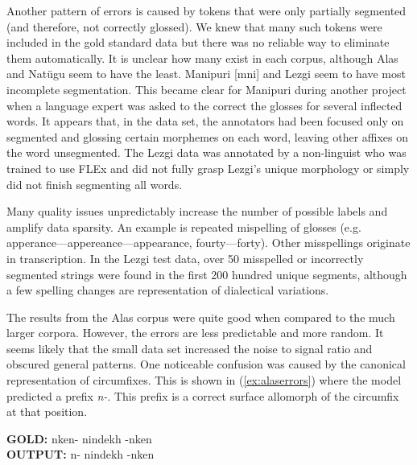 Another pattern of errors is caused by tokens that were only partially segmented (and therefore, not correctly glossed). We knew that many such tokens were included in the gold standard data but there was no reliable way to eliminate them automatically. It is unclear how many exist in each corpus, although Alas and Nat\"ugu seem to have the least. Manipuri [mni] and Lezgi seem to have most incomplete segmentation. This became clear for Manipuri during another project when a language expert was asked to the correct the glosses for several inflected words. It appears that, in the data set, the annotators had been focused only on segmented and glossing certain morphemes on each word, leaving other affixes on the word unsegmented. 
The Lezgi data was annotated by a non-linguist who was trained to use FLEx and did not fully grasp Lezgi's unique morphology or simply did not finish segmenting all words. 

Many quality issues unpredictably increase the number of possible labels and amplify data sparsity. An example is
repeated mispelling of glosses (e.g. apperance---appereance---appearance, fourty---forty). Other misspellings originate in transcription. In the Lezgi test data, over 50 misspelled or incorrectly segmented strings were found in the first 200 hundred unique segments, although a few spelling changes are representation of dialectical variations.  


The results from the Alas corpus were quite good when compared to the much larger corpora. However, the errors are less predictable and more random. It seems likely that the small data set increased the noise to signal ratio and obscured general patterns. 
One noticeable confusion was caused by the canonical representation of circumfixes. This is shown in (\ref{ex:alaserrors}) where the model predicted a prefix \textit{n-}. This prefix is a correct surface allomorph of the circumfix at that position. 

\pex   
\label{ex:alaserrors}
\a \textbf{GOLD:} \hspace{2mm} n\textlangle{}\textrangle{}ken- \hspace{1mm} nindekh \hspace{1mm} -n\textlangle{}\textrangle{}ken \\
\textbf{OUTPUT:} \hspace{2mm} n- \hspace{5mm} nindekh \hspace{2mm} -n\textlangle{}\textrangle{}ken
\xe

